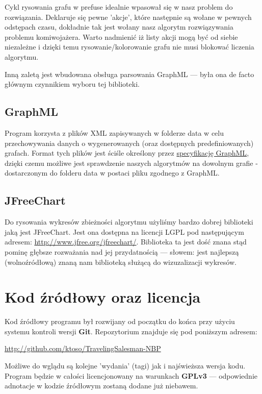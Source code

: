 \documentclass[a4paper]{article}
\begin{document}
Cykl rysowania grafu w prefuse idealnie wpasował się w nasz problem do rozwiązania. Deklaruje się pewne 'akcje', które następnie są wołane w pewnych odstępach czasu, dokładnie tak jest wołany nasz algorytm rozwiązywania problemu komiwojażera. Warto nadmienić iż listy akcji mogą być od siebie niezależne i dzięki temu rysowanie/kolorowanie grafu nie musi blokować liczenia algorytmu. 

Inną zaletą jest wbudowana obsługa parsowania GraphML --- była ona de facto głównym czynnikiem wyboru tej biblioteki.

\subsection{GraphML}
Program korzysta z plików XML zapisywanych w folderze data w celu przechowywania danych o wygenerowanych (oraz dostępnych predefiniowanych) grafach. Format tych plików jest ściśle określony przez \href{http://graphml.graphdrawing.org/specification.html}{specyfikację GraphML}, dzięki czemu możliwe jest sprawdzenie naszych algorytmów na dowolnym grafie - dostarczonym do folderu data w postaci pliku zgodnego z GraphML.

\subsection{JFreeChart}
Do rysowania wykresów zbieżności algorytmu użyliśmy bardzo dobrej biblioteki jaką jest JFreeChart. Jest ona dostępna na licencji LGPL pod następującym adresem: \href{http://www.jfree.org/jfreechart/}{http://www.jfree.org/jfreechart/}. Biblioteka ta jest dość znana stąd pominę głębsze rozważania nad jej przydatnością --- słowem: jest najlepszą (wolnoźródłową) znaną nam biblioteką służącą do wizuzalizacji wykresów.

\section{Kod źródłowy oraz licencja}
Kod źródłowy programu był rozwijany od początku do końca przy użyciu systemu kontroli wersji \textbf{Git}. Repozytorium znajduje się pod poniższym adresem:

\begin{flushleft}
 \href{http://github.com/ktoso/TravelingSalesman-NBP}{http://github.com/ktoso/TravelingSalesman-NBP}
\end{flushleft}

Możliwe do wglądu są kolejne 'wydania' (tagi) jak i najświeższa wersja kodu. Program będzie w całości licencjonowany na warunkach \textbf{GPLv3} --- odpowiednie adnotacje w kodzie źródłowym zostaną dodane już niebawem.
\end{document}
